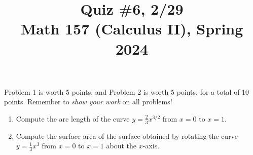 \documentclass[11pt]{article}
\title{Quiz \#6, 2/29 \\ Math 157 (Calculus II), Spring 2024}
\date{}
\begin{document}
\maketitle

\thispagestyle{empty}

\vspace{-2cm}

Problem 1 is worth 5 points, and Problem 2 is worth 5 points, for a total of 10 points. Remember to \emph{show your work} on all problems!

\begin{enumerate}
\item Compute the arc length of the curve $y= \frac{2}{3} x^{3/2}$ from $x = 0$ to $x=1$.

\vspace{8.25cm}

\item Compute the surface area of the surface obtained by rotating the curve $y=\frac{1}{3}x^3$ from $x = 0$ to $x=1$ about the $x$-axis.

\end{enumerate}
\end{document}
